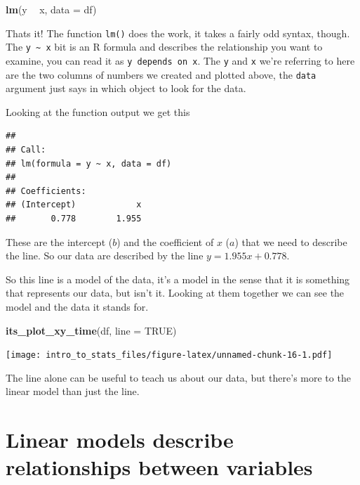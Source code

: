 \documentclass[
]{book}
\newenvironment{Shaded}{\begin{snugshade}}{\end{snugshade}}
\newcommand{\DataTypeTok}[1]{\textcolor[rgb]{0.13,0.29,0.53}{#1}}
\newcommand{\KeywordTok}[1]{\textcolor[rgb]{0.13,0.29,0.53}{\textbf{#1}}}
\newcommand{\NormalTok}[1]{#1}
\newcommand{\OperatorTok}[1]{\textcolor[rgb]{0.81,0.36,0.00}{\textbf{#1}}}
\newcommand{\OtherTok}[1]{\textcolor[rgb]{0.56,0.35,0.01}{#1}}
\newcommand{\StringTok}[1]{\textcolor[rgb]{0.31,0.60,0.02}{#1}}
\begin{document}
\begin{Shaded}
\begin{Highlighting}[]
\KeywordTok{lm}\NormalTok{(y }\OperatorTok{~}\StringTok{ }\NormalTok{x, }\DataTypeTok{data =}\NormalTok{ df)}
\end{Highlighting}
\end{Shaded}

Thats it! The function \texttt{lm()} does the work, it takes a fairly odd syntax, though. The \texttt{y\ \textasciitilde{}\ x} bit is an R formula and describes the relationship you want to examine, you can read it as \texttt{y\ depends\ on\ x}. The \texttt{y} and \texttt{x} we're referring to here are the two columns of numbers we created and plotted above, the \texttt{data} argument just says in which object to look for the data.

Looking at the function output we get this

\begin{verbatim}
## 
## Call:
## lm(formula = y ~ x, data = df)
## 
## Coefficients:
## (Intercept)            x  
##       0.778        1.955
\end{verbatim}

These are the intercept (\(b\)) and the coefficient of \(x\) (\(a\)) that we need to describe the line. So our data are described by the line \(y = 1.955x + 0.778\).

So this line is a model of the data, it's a model in the sense that it is something that represents our data, but isn't it. Looking at them together we can see the model and the data it stands for.

\begin{Shaded}
\begin{Highlighting}[]
\KeywordTok{its_plot_xy_time}\NormalTok{(df, }\DataTypeTok{line =} \OtherTok{TRUE}\NormalTok{)}
\end{Highlighting}
\end{Shaded}

\texttt{[image: intro\_to\_stats\_files/figure-latex/unnamed-chunk-16-1.pdf]}

The line alone can be useful to teach us about our data, but there's more to the linear model than just the line.

\hypertarget{linear-models-describe-relationships-between-variables}{%
\section{Linear models describe relationships between variables}\label{linear-models-describe-relationships-between-variables}}
\end{document}
